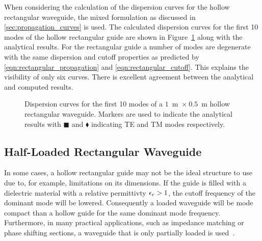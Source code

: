 When considering the calculation of the dispersion curves for the
hollow rectangular waveguide, the mixed formulation as discussed in
\ref{sec:propagation_curves} is used.  The calculated dispersion
curves for the first 10 modes of the hollow rectangular guide are
shown in Figure~\ref{fig:hollow_rectangular_dispersion_curves} along
with the analytical results. For the rectangular guide a number of
modes are degenerate with the same dispersion and cutoff properties as
predicted by \eqref{eqn:rectangular_propagation} and
\eqref{eqn:rectangular_cutoff}. This explains the visibility of only
six curves. There is excellent agreement between the analytical and
computed results.
\begin{figure}[h]
 \centering
 \caption{Dispersion curves for the first 10 modes of a $1$~m~$\times~0.5$~m hollow rectangular waveguide. Markers are used to indicate the analytical results with $\blacksquare$ and $\blacklozenge$ indicating TE and TM modes respectively.}
 \label{fig:hollow_rectangular_dispersion_curves}
\end{figure}
\subsection{Half-Loaded Rectangular Waveguide}
In some cases, a hollow rectangular guide may not be the ideal
structure to use due to, for example, limitations on its
dimensions. If the guide is filled with a dielectric material with a
relative permittivty $\epsilon_r > 1$, the cutoff frequency of the dominant
mode will be lowered. Consequently a loaded waveguide will be mode
compact than a hollow guide for the same dominant mode
frequency. Furthermore, in many practical applications, such as
impedance matching or phase shifting sections, a waveguide that is
only partially loaded is used~\cite{Poz2005}.

